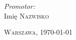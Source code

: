 \begin{titlepage}
	\vspace{0.05\textheight}

	\begin{flushright}
		\begin{minipage}{0.4\textwidth}
		\begin{flushright}
		\emph{Promotor:}\\
		Imię \textsc{Nazwisko}
		\end{flushright}
		\end{minipage}
	\end{flushright}

	\vfill

	\begin{center} {\large \textsc {Warszawa,} \today} \end{center}
\end{titlepage}

